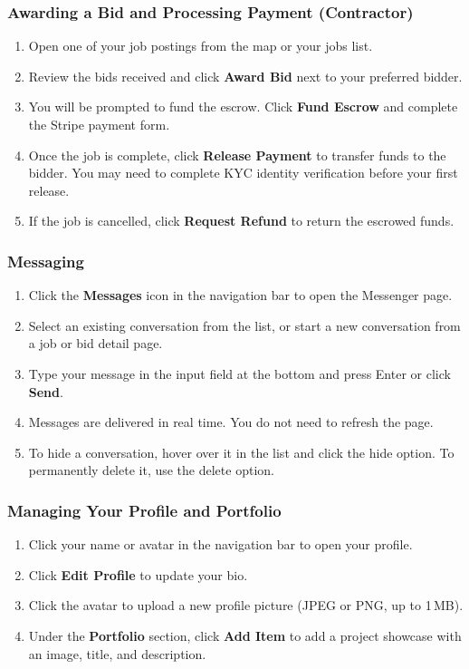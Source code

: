 \documentclass[11pt]{article}
\begin{document}
\subsubsection{Awarding a Bid and Processing Payment (Contractor)}
\begin{enumerate}[leftmargin=1.8em]
  \item Open one of your job postings from the map or your jobs list.
  \item Review the bids received and click \textbf{Award Bid} next to your preferred bidder.
  \item You will be prompted to fund the escrow. Click \textbf{Fund Escrow} and complete the Stripe payment form.
  \item Once the job is complete, click \textbf{Release Payment} to transfer funds to the bidder. You may need to complete KYC identity verification before your first release.
  \item If the job is cancelled, click \textbf{Request Refund} to return the escrowed funds.
\end{enumerate}

\subsubsection{Messaging}
\begin{enumerate}[leftmargin=1.8em]
  \item Click the \textbf{Messages} icon in the navigation bar to open the Messenger page.
  \item Select an existing conversation from the list, or start a new conversation from a job or bid detail page.
  \item Type your message in the input field at the bottom and press Enter or click \textbf{Send}.
  \item Messages are delivered in real time. You do not need to refresh the page.
  \item To hide a conversation, hover over it in the list and click the hide option. To permanently delete it, use the delete option.
\end{enumerate}

\subsubsection{Managing Your Profile and Portfolio}
\begin{enumerate}[leftmargin=1.8em]
  \item Click your name or avatar in the navigation bar to open your profile.
  \item Click \textbf{Edit Profile} to update your bio.
  \item Click the avatar to upload a new profile picture (JPEG or PNG, up to 1\,MB).
  \item Under the \textbf{Portfolio} section, click \textbf{Add Item} to add a project showcase with an image, title, and description.
\end{enumerate}
\end{document}
